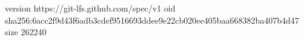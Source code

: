 version https://git-lfs.github.com/spec/v1
oid sha256:6acc2f9d43f6adb3cdef9516693ddee9e22cb020ee405baa668382ba407b4d47
size 262240
